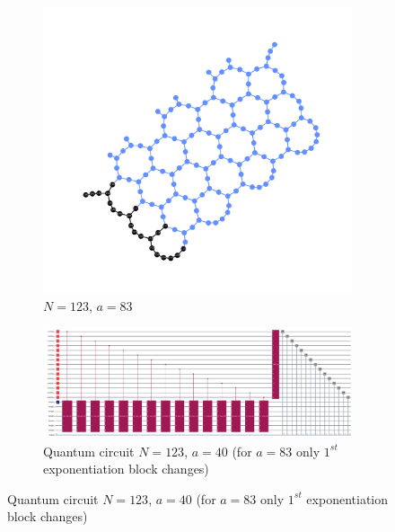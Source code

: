 \documentclass[conference,twoside]{IEEEtran}
\begin{document}
\begin{figure}[!htbp]
\begin{subfigure}{0.2\textwidth}
        \includegraphics[width=\textwidth]{ibm_aachen_physical_circuit_layout_N123_a83_PT1_SO0.png}
        \caption{$N=123$, $a=83$}
    \end{subfigure}
    \hfill
    \begin{subfigure}{0.45\textwidth}
        \centering
        \includegraphics[width=\textwidth]{ibm_aachen_quantum_circuit_N123_a40.png}
        \caption{Quantum circuit $N=123$, $a=40$ (for $a=83$ only $1^{st}$ exponentiation block changes) }
    \end{subfigure}

    \vspace{0pt} %


\end{figure}
\end{document}
